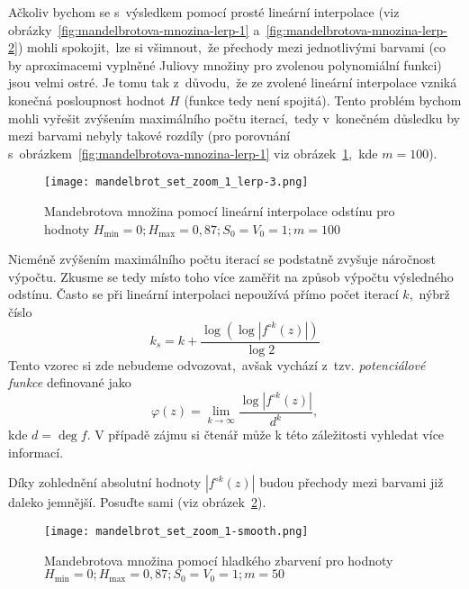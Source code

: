 Ačkoliv bychom se s~výsledkem pomocí prosté lineární interpolace (viz obrázky~\ref{fig:mandelbrotova-mnozina-lerp-1} a~\ref{fig:mandelbrotova-mnozina-lerp-2}) mohli spokojit,~lze si všimnout,~že přechody mezi jednotlivými barvami (co by aproximacemi vyplněné Juliovy množiny pro zvolenou polynomiální funkci) jsou velmi ostré. Je tomu tak z~důvodu,~že ze zvolené lineární interpolace vzniká konečná posloupnost hodnot $H$ (funkce tedy není spojitá). Tento problém bychom mohli vyřešit zvýšením maximálního počtu iterací,~tedy v~konečném důsledku by mezi barvami nebyly takové rozdíly (pro porovnání s~obrázkem~\ref{fig:mandelbrotova-mnozina-lerp-1} viz obrázek~\ref{fig:mandelbrotova-mnozina-lerp-3},~kde $m=100$).
\begin{figure}[h]
    \centering
    \texttt{[image: mandelbrot\_set\_zoom\_1\_lerp-3.png]}
    \caption{Mandebrotova množina pomocí lineární interpolace odstínu pro hodnoty $H_{\text{min}}=0;H_{\text{max}}=0{,}87;S_0=V_0=1;m=100$}
    \label{fig:mandelbrotova-mnozina-lerp-3}
\end{figure}
Nicméně zvýšením maximálního počtu iterací se podstatně zvyšuje náročnost výpočtu. Zkusme se tedy místo toho více zaměřit na způsob výpočtu výsledného odstínu. Často se při lineární interpolaci nepoužívá přímo počet iterací $k$,~nýbrž číslo
\[k_s=k+\dfrac{\log(\log|f^{\circ k}(z)|)}{\log{2}}\]
Tento vzorec si zde nebudeme odvozovat,~avšak vychází z~tzv. \emph{potenciálové funkce} definované jako
\[\varphi(z)=\lim_{k\to \infty }{\frac {\log|f^{\circ k}(z)|}{d^{k}}},\]
kde $d=\deg{f}$. V případě zájmu si čtenář může k této záležitosti vyhledat více informací.

Díky zohlednění absolutní hodnoty $|f^{\circ k}(z)|$ budou přechody mezi barvami již daleko jemnější. Posuďte sami (viz obrázek~\ref{fig:mandelbrotova-mnozina-smooth}).
\begin{figure}[h]
    \centering
    \texttt{[image: mandelbrot\_set\_zoom\_1-smooth.png]}
    \caption{Mandebrotova množina pomocí hladkého zbarvení pro hodnoty $H_{\text{min}}=0;H_{\text{max}}=0{,}87;S_0=V_0=1;m=50$}
    \label{fig:mandelbrotova-mnozina-smooth}
\end{figure}